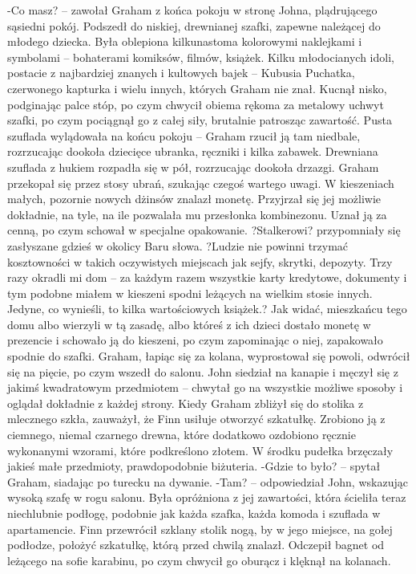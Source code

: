 \documentclass[../MAIN.tex]{subfiles}
\begin{document}
-Co masz? -- zawołał Graham z końca pokoju w stronę Johna, plądrującego sąsiedni pokój. Podszedł do niskiej, drewnianej szafki, zapewne należącej do młodego dziecka. Była oblepiona kilkunastoma kolorowymi naklejkami i symbolami -- bohaterami komiksów, filmów, książek. Kilku młodocianych idoli, postacie z najbardziej znanych i kultowych bajek -- Kubusia Puchatka, czerwonego kapturka i wielu innych, których Graham nie znał.
Kucnął nisko, podginając palce stóp, po czym chwycił obiema rękoma za metalowy uchwyt szafki, po czym pociągnął go z całej siły, brutalnie patrosząc zawartość. Pusta szuflada wylądowała na końcu pokoju -- Graham rzucił ją tam niedbale, rozrzucając dookoła dziecięce ubranka, ręczniki i kilka zabawek.
Drewniana szuflada z hukiem rozpadła się w pół, rozrzucając dookoła drzazgi.
Graham przekopał się przez stosy ubrań, szukając czegoś wartego uwagi. W kieszeniach małych, pozornie nowych dżinsów znalazł monetę. Przyjrzał się jej możliwie dokładnie, na tyle, na ile pozwalała mu przesłonka kombinezonu. Uznał ją za cenną, po czym schował w specjalne opakowanie.
?Stalkerowi? przypomniały się zasłyszane gdzieś w okolicy Baru słowa.
?Ludzie nie powinni trzymać kosztowności w takich oczywistych miejscach jak sejfy, skrytki, depozyty. Trzy razy okradli mi dom -- za każdym razem wszystkie karty kredytowe, dokumenty i tym podobne miałem w kieszeni spodni leżących na wielkim stosie innych. Jedyne, co wynieśli, to kilka wartościowych książek.?
Jak widać, mieszkańcu tego domu albo wierzyli w tą zasadę, albo któreś z ich dzieci dostało monetę w prezencie i schowało ją do kieszeni, po czym zapominając o niej, zapakowało spodnie do szafki.
Graham, łapiąc się za kolana, wyprostował się powoli, odwrócił się na pięcie, po czym wszedł do salonu. John siedział na kanapie i męczył się z jakimś kwadratowym przedmiotem -- chwytał go na wszystkie możliwe sposoby i oglądał dokładnie z każdej strony. Kiedy Graham zbliżył się do stolika z mlecznego szkła, zauważył, że Finn usiłuje otworzyć szkatułkę.
Zrobiono ją z ciemnego, niemal czarnego drewna, które dodatkowo ozdobiono ręcznie wykonanymi wzorami, które podkreślono złotem. W środku pudełka brzęczały jakieś małe przedmioty, prawdopodobnie biżuteria.
-Gdzie to było? -- spytał Graham, siadając po turecku na dywanie.
-Tam? -- odpowiedział John, wskazując wysoką szafę w rogu salonu. Była opróżniona z jej zawartości, która ścieliła teraz niechlubnie podłogę, podobnie jak każda szafka, każda komoda i szuflada w apartamencie.
Finn przewrócił szklany stolik nogą, by w jego miejsce, na gołej podłodze, położyć szkatułkę, którą przed chwilą znalazł. Odczepił bagnet od leżącego na sofie karabinu, po czym chwycił go oburącz i klęknął na kolanach.
\end{document}
